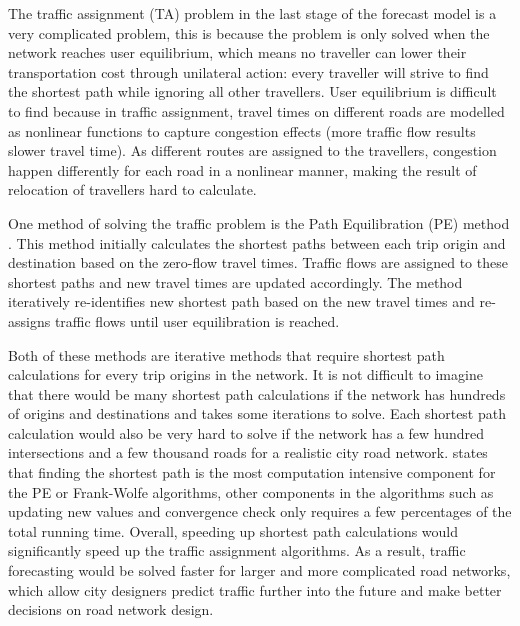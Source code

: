 The traffic assignment (TA) problem in the last stage of the forecast model is a very complicated problem, 
this is because the problem is only solved when the network reaches user equilibrium,
which means no traveller can lower their transportation cost through unilateral action: every traveller will strive to find the shortest path while ignoring all other travellers.
User equilibrium is difficult to find because in traffic assignment,
travel times on different roads are modelled as nonlinear functions to capture congestion effects (more traffic flow results slower travel time).
As different routes are assigned to the travellers,
congestion happen differently for each road in a nonlinear manner,
making the result of relocation of travellers hard to calculate.

One method of solving the traffic problem is the Path Equilibration (PE) method \citep{Florian}.
This method initially calculates the shortest paths between each trip origin and destination based on the zero-flow travel times.
Traffic flows are assigned to these shortest paths and new travel times are updated accordingly.
The method iteratively re-identifies new shortest path based on the new travel times and re-assigns traffic flows until user equilibration is reached.


Both of these methods are iterative methods that require shortest path calculations for every trip origins in the network.
It is not difficult to imagine that there would be many shortest path calculations if the network has hundreds of origins and destinations and takes some iterations to solve.
Each shortest path calculation would also be very hard to solve if the network has a few hundred intersections and a few thousand roads for a realistic city road network.
\citet{Sheffi} states that finding the shortest path is the most computation intensive component for the PE or Frank-Wolfe algorithms, 
other components in the algorithms such as updating new values and convergence check only requires a few percentages of the total running time.
Overall, speeding up shortest path calculations would significantly speed up the traffic assignment algorithms.
As a result,
traffic forecasting would be solved faster for larger and more complicated road networks,
which allow city designers predict traffic further into the future and make better decisions on road network design.

